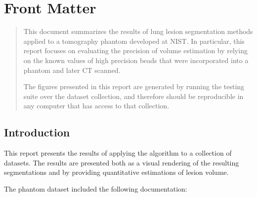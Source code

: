 \documentclass{InsightArticle}
\begin{document}
\newcommand{\insertResultsForDataset}[2]{
\subsection{Dataset #1 #2}
\composeFigureFromDatasetFeatures{#1}{#2}
\composeFigureFromDatasetSegmentations{#1}{#2}
}

\maketitle

\ifhtml
\chapter*{Front Matter\label{front}}
\fi


\begin{abstract}
\noindent
This document summarizes the results of lung lesion segmentation methods
applied to a tomography phantom developed at NIST. In particular, this report
focuses on evaluating the precision of volume estimation by relying on the
known values of high precision beads that were incorporated into a phantom and
later CT scanned.

The figures presented in this report are generated by running the testing suite
over the dataset collection, and therefore should be reproducible in any
computer that has access to that collection.
\end{abstract}

\tableofcontents

\section{Introduction}

This report presents the results of applying the algorithm to a collection of
datasets. The results are presented both as a visual rendering of the resulting
segmentations and by providing quantitative estimations of lesion volume.

The phantom dataset included the following documentation:
\end{document}
